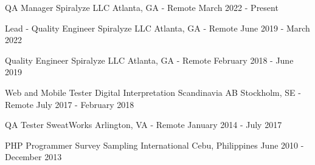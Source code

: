 

\begin{cventries}

  \cventry
    {QA Manager} %
    {Spiralyze LLC} %
    {Atlanta, GA - Remote} %
    {March 2022 - Present} %
    {
    }

  \cventry
    {Lead - Quality Engineer} %
    {Spiralyze LLC} %
    {Atlanta, GA - Remote} %
    {June 2019 - March 2022} %
    {
    }

  \cventry
    {Quality Engineer} %
    {Spiralyze LLC} %
    {Atlanta, GA - Remote} %
    {February 2018 - June 2019} %
    {
    }

  \cventry
  {Web and Mobile Tester} %
  {Digital Interpretation Scandinavia AB} %
  {Stockholm, SE - Remote} %
  {July 2017 - February 2018} %
  {
  }

  \cventry
    {QA Tester} %
    {SweatWorks} %
    {Arlington, VA - Remote} %
    {January 2014 - July 2017} %
    {
    }

  \cventry
    {PHP Programmer} %
    {Survey Sampling International} %
    {Cebu, Philippines} %
    {June 2010 - December 2013} %
    {
    }

\end{cventries}
